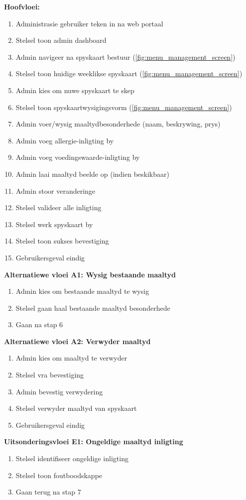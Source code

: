 \textbf{Hoofvloei:}
\begin{enumerate}
    \item Administrasie gebruiker teken in na web portaal
    \item Stelsel toon admin dashboard
    \item Admin navigeer na spyskaart bestuur (\autoref{fig:menu_management_screen})
    \item Stelsel toon huidige weeklikse spyskaart (\autoref{fig:menu_management_screen})
    \item Admin kies om nuwe spyskaart te skep
    \item Stelsel toon spyskaartwysigingsvorm (\autoref{fig:menu_management_screen})
    \item Admin voer/wysig maaltydbesonderhede (naam, beskrywing, prys)
    \item Admin voeg allergie-inligting by
    \item Admin voeg voedingswaarde-inligting by
    \item Admin laai maaltyd beelde op (indien beskikbaar)
    \item Admin stoor veranderinge
    \item Stelsel valideer alle inligting
    \item Stelsel werk spyskaart by
    \item Stelsel toon sukses bevestiging
    \item Gebruikersgeval eindig
\end{enumerate}

\textbf{Alternatiewe vloei A1: Wysig bestaande maaltyd}
\begin{enumerate}
    \item[5a.] Admin kies om bestaande maaltyd te wysig
    \item Stelsel gaan haal bestaande maaltyd besonderhede
    \item Gaan na stap 6
\end{enumerate}

\textbf{Alternatiewe vloei A2: Verwyder maaltyd}
\begin{enumerate}
    \item[5b.] Admin kies om maaltyd te verwyder
    \item Stelsel vra bevestiging
    \item Admin bevestig verwydering
    \item Stelsel verwyder maaltyd van spyskaart
    \item Gebruikersgeval eindig
\end{enumerate}

\textbf{Uitsonderingsvloei E1: Ongeldige maaltyd inligting}
\begin{enumerate}
    \item[12a.] Stelsel identifiseer ongeldige inligting
    \item Stelsel toon foutboodskappe
    \item Gaan terug na stap 7
\end{enumerate}

